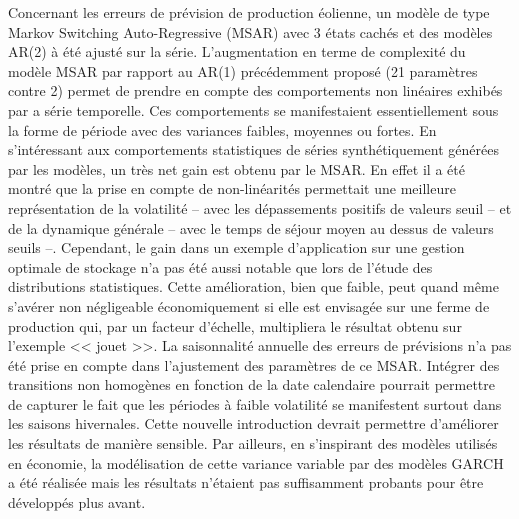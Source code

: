 \documentclass[12pt, french]{report}
\begin{document}
Concernant les erreurs de prévision de production éolienne, un modèle de type Markov Switching Auto-Regressive (MSAR) avec 3 états cachés et des modèles AR(2) à été ajusté sur la série. L'augmentation en terme de complexité du modèle MSAR par rapport au AR(1) précédemment proposé (21 paramètres contre 2) permet de prendre en compte des comportements non linéaires exhibés par a série temporelle. Ces comportements se manifestaient essentiellement sous la forme de période avec des variances faibles, moyennes ou fortes. En s'intéressant aux comportements statistiques de séries synthétiquement générées par les modèles, un très net gain est obtenu par le MSAR. En effet il a été montré que la prise en compte de non-linéarités permettait une meilleure représentation de la volatilité -- avec les dépassements positifs de valeurs seuil -- et de la dynamique générale -- avec le temps de séjour moyen au dessus de valeurs seuils --. Cependant, le gain dans un exemple d'application sur une gestion optimale de stockage n'a pas été aussi notable que lors de l'étude des distributions statistiques. Cette amélioration, bien que faible, peut quand même s'avérer non négligeable économiquement si elle est envisagée sur une ferme de production qui, par un facteur d'échelle, multipliera le résultat obtenu sur l'exemple << jouet >>. La saisonnalité annuelle des erreurs de prévisions n'a pas été prise en compte dans l'ajustement des paramètres de ce MSAR. Intégrer des transitions non homogènes en fonction de la date calendaire pourrait permettre de capturer le fait que les périodes à faible volatilité se manifestent surtout dans les saisons hivernales. Cette nouvelle introduction devrait permettre d'améliorer les résultats de manière sensible. Par ailleurs, en s'inspirant des modèles utilisés en économie, la modélisation de cette variance variable par des modèles GARCH a été réalisée mais les résultats n'étaient pas suffisamment probants pour être développés plus avant.
\end{document}
